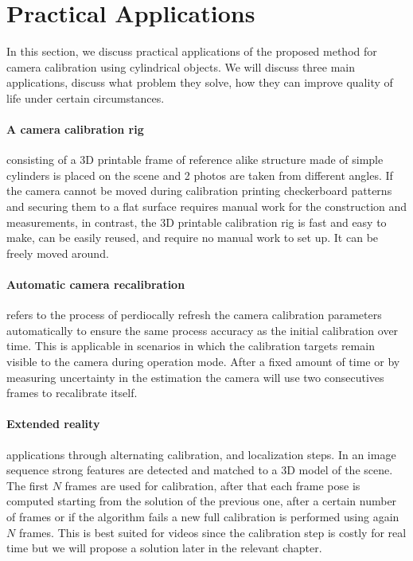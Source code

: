 \section{Practical Applications}
\label{sec:applications}

In this section, we discuss practical applications of the proposed method for camera calibration using cylindrical objects.
We will discuss three main applications, discuss what problem they solve, how they can improve quality of life under certain circumstances.

\paragraph{A camera calibration rig} consisting of a 3D printable frame of reference alike structure made of simple cylinders is placed on the scene and 2 photos are taken from different angles. If the camera cannot be moved during calibration printing checkerboard patterns and securing them to a flat surface requires manual work for the construction and measurements, in contrast, the 3D printable calibration rig is fast and easy to make, can be easily reused, and require no manual work to set up. It can be freely moved around.

\paragraph{Automatic camera recalibration} refers to the process of perdiocally refresh the camera calibration parameters automatically to ensure the same process accuracy as the initial calibration over time. This is applicable in scenarios in which the calibration targets remain visible to the camera during operation mode. After a fixed amount of time or by measuring uncertainty in the estimation the camera will use two consecutives frames to recalibrate itself.

\paragraph{Extended reality} applications through alternating calibration, and localization steps. In an image sequence strong features are detected and matched to a 3D model of the scene. The first $N$ frames are used for calibration, after that each frame pose is computed starting from the solution of the previous one, after a certain number of frames or if the algorithm fails a new full calibration is performed using again $N$ frames. This is best suited for videos since the calibration step is costly for real time but we will propose a solution later in the relevant chapter.



